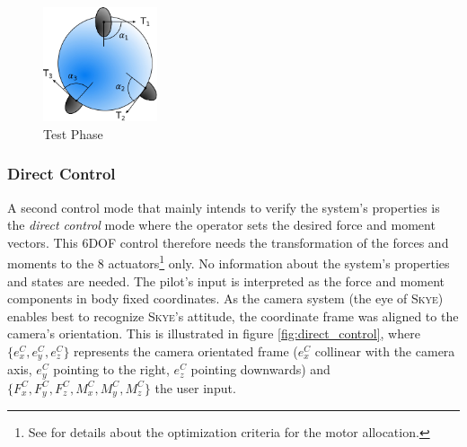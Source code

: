 \begin{figure}[H] %
	\begin{center}
		\includegraphics[width=0.3\textwidth]{TPC.pdf}
		\caption[Test Phase]{Test Phase}  
		\label{fig:test_phase}		
	\end{center}
\end{figure}


\subsubsection{Direct Control} 
A second control mode that mainly intends to verify the system's properties is the \textit{direct control} mode where the operator sets the desired force and moment vectors. This 6DOF control therefore needs the transformation of the forces and moments to the 8 actuators\footnote{See \cite{schaffnervu} for details about the optimization criteria for the motor allocation.} only. No information about the system's properties and states are needed. The pilot's input is interpreted as the force and moment components in body fixed coordinates. As the camera system (the eye of \textsc{Skye}) enables best to recognize \textsc{Skye}'s attitude, the coordinate frame was aligned to the camera's orientation. This is illustrated in figure \ref{fig:direct_control}, where $\{e_x^C, e_y^C, e_z^C\}$ represents the camera orientated frame ($e_x^C$ collinear with the camera axis, $e_y^C$ pointing to the right, $e_z^C$  pointing downwards) and $\{F_x^C, F_y^C, F_z^C, M_x^C, M_y^C, M_z^C\}$ the user input.


